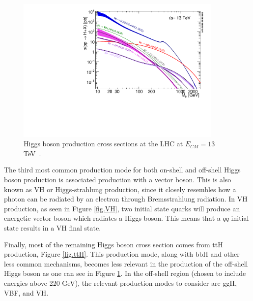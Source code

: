 \begin{figure}[!h]
\centering
\includegraphics[width=0.9\textwidth,clip] {figures/plotAll_13tev_BSM_sqrt.pdf}
\caption{Higgs boson production cross sections at the LHC at $E_{CM}=13$ TeV~\cite{YR4}.}
\label{fig:prodModes}
\end{figure}

The third most common production mode for both on-shell and off-shell Higgs boson production is associated production with a vector boson. This is also known as VH or Higgs-strahlung production, since it closely resembles how a photon can be radiated by an electron through Bremsstrahlung radiation. In VH production, as seen in Figure \ref{fig.VH}, two initial state quarks will produce an energetic vector boson which radiates a Higgs boson. This means that a $q\bar{q}$ initial state results in a VH final state. 

Finally, most of the remaining Higgs boson cross section comes from ttH production, Figure \ref{fig.ttH}. This production mode, along with bbH and other less common mechanisms, becomes less relevant in the production of the off-shell Higgs boson as one can see in Figure \ref{fig:prodModes}. In the off-shell region (chosen to include energies above 220 GeV), the relevant production modes to consider are ggH, VBF, and VH. 


